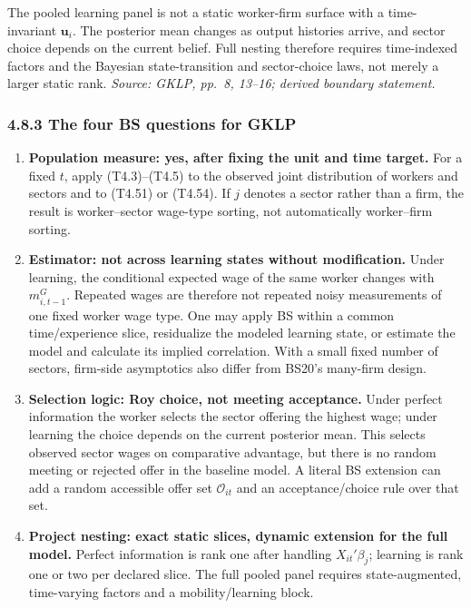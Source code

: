 \documentclass[11pt]{article}
\begin{document}
The pooled learning panel is not a static worker-firm surface with a
time-invariant \(\mathbf u_i\).  The posterior mean changes as output histories
arrive, and sector choice depends on the current belief.  Full nesting
therefore requires time-indexed factors and the Bayesian state-transition and
sector-choice laws, not merely a larger static rank.
\textit{Source: GKLP, pp.\ 8, 13--16; derived boundary statement.}

\subsubsection{4.8.3 The four BS questions for GKLP}

\begin{enumerate}
\item \textbf{Population measure: yes, after fixing the unit and time
  target.}  For a fixed \(t\), apply (T4.3)--(T4.5) to the observed joint
  distribution of workers and sectors and to (T4.51) or (T4.54).  If \(j\)
  denotes a sector rather than a firm, the result is worker--sector wage-type
  sorting, not automatically worker--firm sorting.
\item \textbf{Estimator: not across learning states without modification.}
  Under learning, the conditional expected wage of the same worker changes
  with \(m_{i,t-1}^G\).  Repeated wages are therefore not repeated noisy
  measurements of one fixed worker wage type.  One may apply BS within a
  common time/experience slice, residualize the modeled learning state, or
  estimate the model and calculate its implied correlation.  With a small
  fixed number of sectors, firm-side asymptotics also differ from BS20's
  many-firm design.
\item \textbf{Selection logic: Roy choice, not meeting acceptance.}  Under
  perfect information the worker selects the sector offering the highest
  wage; under learning the choice depends on the current posterior mean.
  This selects observed sector wages on comparative advantage, but there is
  no random meeting or rejected offer in the baseline model.  A literal BS
  extension can add a random accessible offer set \(\mathcal O_{it}\) and an
  acceptance/choice rule over that set.
\item \textbf{Project nesting: exact static slices, dynamic extension for the
  full model.}  Perfect information is rank one after handling
  \(X_{it}'\beta_j\); learning is rank one or two per declared slice.  The
  full pooled panel requires state-augmented, time-varying factors and a
  mobility/learning block.
\end{enumerate}
\end{document}
